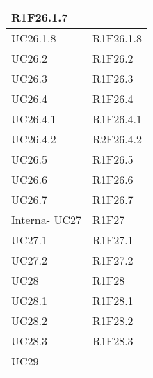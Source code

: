 \begin{center}
\begin{longtable}{|p{44mm}|p{22mm}|}
R1F26.1.7 \newline
\\
\hline
UC26.1.8 &

R1F26.1.8 \newline
\\
\hline
UC26.2 &

R1F26.2 \newline
\\
\hline
UC26.3 &

R1F26.3 \newline
\\
\hline
UC26.4 &

R1F26.4 \newline
\\
\hline
UC26.4.1 &

R1F26.4.1 \newline
\\
\hline
UC26.4.2 &

R2F26.4.2 \newline
\\
\hline
UC26.5 &

R1F26.5 \newline
\\
\hline
UC26.6 &

R1F26.6 \newline
\\
\hline
UC26.7 &

R1F26.7 \newline
\\
\hline
Interna- UC27 &

R1F27 \newline
\\
\hline
UC27.1 &

R1F27.1 \newline
\\
\hline
UC27.2 &

R1F27.2 \newline
\\
\hline
UC28 &

R1F28 \newline
\\
\hline
UC28.1 &

R1F28.1 \newline
\\
\hline
UC28.2 &

R1F28.2 \newline
\\
\hline
UC28.3 &

R1F28.3 \newline
\\
\hline
UC29 &


\end{longtable}
\end{center}
